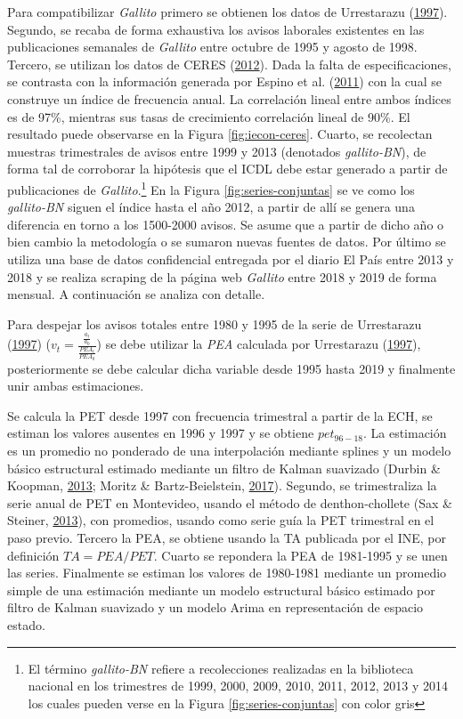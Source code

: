 \documentclass[12pt,oneside]{reedthesis}
\begin{document}
Para compatibilizar \emph{Gallito} primero se obtienen los datos de Urrestarazu (\protect\hyperlink{ref-Urrestarazu1997}{1997}). Segundo, se recaba de forma exhaustiva los avisos laborales existentes en las publicaciones semanales de \emph{Gallito} entre octubre de 1995 y agosto de 1998. Tercero, se utilizan los datos de CERES (\protect\hyperlink{ref-Ceres2012}{2012}). Dada la falta de especificaciones, se contrasta con la información generada por Espino et al. (\protect\hyperlink{ref-Alma2011}{2011}) con la cual se construye un índice de frecuencia anual. La correlación lineal entre ambos índices es de 97\%, mientras sus tasas de crecimiento correlación lineal de 90\%. El resultado puede observarse en la Figura \ref{fig:iecon-ceres}. Cuarto, se recolectan muestras trimestrales de avisos entre 1999 y 2013 (denotados \emph{gallito-BN}), de forma tal de corroborar la hipótesis que el ICDL debe estar generado a partir de publicaciones de \emph{Gallito}.\footnote{El término \emph{gallito-BN} refiere a recolecciones realizadas en la biblioteca nacional en los trimestres de 1999, 2000, 2009, 2010, 2011, 2012, 2013 y 2014 los cuales pueden verse en la Figura \ref{fig:series-conjuntas} con color gris} En la Figura \ref{fig:series-conjuntas} se ve como los \emph{gallito-BN} siguen el índice hasta el año 2012, a partir de allí se genera una diferencia en torno a los 1500-2000 avisos. Se asume que a partir de dicho año o bien cambio la metodología o se sumaron nuevas fuentes de datos. Por último se utiliza una base de datos confidencial entregada por el diario El País entre 2013 y 2018 y se realiza scraping de la página web \emph{Gallito} entre 2018 y 2019 de forma mensual. A continuación se analiza con detalle.

Para despejar los avisos totales entre 1980 y 1995 de la serie de Urrestarazu (\protect\hyperlink{ref-Urrestarazu1997}{1997}) (\(v_t=\frac{\frac{a_t}{a_0}}{\frac{PEA_t}{PEA_0}}\)) se debe utilizar la \emph{PEA} calculada por Urrestarazu (\protect\hyperlink{ref-Urrestarazu1997}{1997}), posteriormente se debe calcular dicha variable desde 1995 hasta 2019 y finalmente unir ambas estimaciones.

Se calcula la PET desde 1997 con frecuencia trimestral a partir de la ECH, se estiman los valores ausentes en 1996 y 1997 y se obtiene \(pet_{96-18}\). La estimación es un promedio no ponderado de una interpolación mediante splines y un modelo básico estructural estimado mediante un filtro de Kalman suavizado (Durbin \& Koopman, \protect\hyperlink{ref-Durbin2013}{2013}; Moritz \& Bartz-Beielstein, \protect\hyperlink{ref-Moritz2017}{2017}).
Segundo, se trimestraliza la serie anual de PET en Montevideo, usando el método de denthon-chollete (Sax \& Steiner, \protect\hyperlink{ref-Sax2013}{2013}), con promedios, usando como serie guía la PET trimestral en el paso previo. Tercero la PEA, se obtiene usando la TA publicada por el INE, por definición \(TA = PEA/PET\).
Cuarto se repondera la PEA de 1981-1995 y se unen las series. Finalmente se estiman los valores de 1980-1981 mediante un promedio simple de una estimación mediante un modelo estructural básico estimado por filtro de Kalman suavizado y un modelo Arima en representación de espacio estado.
\end{document}
